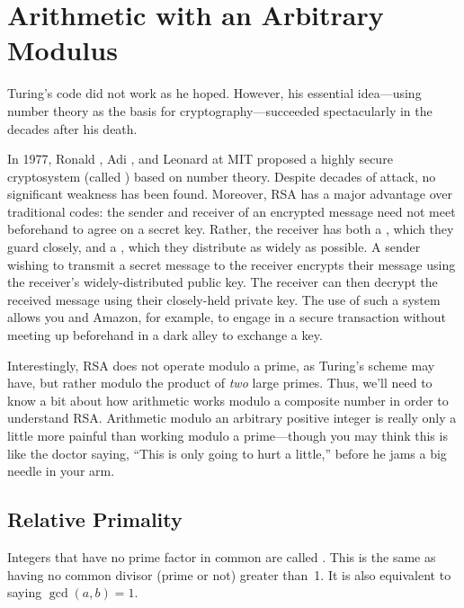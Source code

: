 \section{Arithmetic with an Arbitrary Modulus}\label{arithmetic_modn_sec}

Turing's code did not work as he hoped.  However, his essential
idea---using number theory as the basis for cryptography---succeeded
spectacularly in the decades after his death.

In 1977, Ronald , Adi , and Leonard
 at MIT proposed a highly secure cryptosystem (called
\textbf{}) based on number theory.  Despite decades of
attack, no significant weakness has been found.  Moreover, RSA has a
major advantage over traditional codes: the sender and receiver of an
encrypted message need not meet beforehand to agree on a secret key.
Rather, the receiver has both a , which they guard
closely, and a , which they distribute as widely as
possible.  A sender wishing to transmit a secret message to the
receiver encrypts their message using the receiver's
widely-distributed public key.  The receiver can then decrypt the
received message using their closely-held private key.  The use of
such a  system allows you and Amazon,
for example, to engage in a secure transaction without meeting up
beforehand in a dark alley to exchange a key.

Interestingly, RSA does not operate modulo a prime, as Turing's scheme
may have, but rather modulo the product of \emph{two} large primes.
Thus, we'll need to know a bit about how arithmetic works modulo a
composite number in order to understand RSA.  Arithmetic modulo an
arbitrary positive integer is really only a little more painful than
working modulo a prime---though you may think this is like
the doctor saying, ``This is only going to hurt a little,'' before he
jams a big needle in your arm.

\subsection{Relative Primality}

Integers that have no prime factor in common are called
.  This is the same as having no common divisor
(prime or not) greater than~1.  It is also equivalent to saying
$\gcd(a, b) = 1$.

